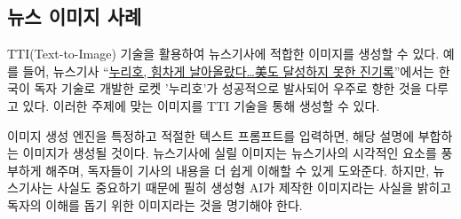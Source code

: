 \documentclass[
  letterpaper,
]{book}
\begin{document}
\hypertarget{uxb274uxc2a4-uxc774uxbbf8uxc9c0-uxc0acuxb840}{%
\subsection{뉴스 이미지
사례}\label{uxb274uxc2a4-uxc774uxbbf8uxc9c0-uxc0acuxb840}}

TTI(Text-to-Image) 기술을 활용하여 뉴스기사에 적합한 이미지를 생성할 수
있다. 예를 들어, 뉴스기사
``\href{https://v.daum.net/v/20230525184307343}{누리호, 힘차게
날아올랐다\ldots 美도 달성하지 못한 진기록}''에서는 한국이 독자 기술로
개발한 로켓 '누리호'가 성공적으로 발사되어 우주로 향한 것을 다루고 있다.
이러한 주제에 맞는 이미지를 TTI 기술을 통해 생성할 수 있다.

이미지 생성 엔진을 특정하고 적절한 텍스트 프롬프트를 입력하면, 해당
설명에 부합하는 이미지가 생성될 것이다. 뉴스기사에 실릴 이미지는
뉴스기사의 시각적인 요소를 풍부하게 해주며, 독자들이 기사의 내용을 더
쉽게 이해할 수 있게 도와준다. 하지만, 뉴스기사는 사실도 중요하기 때문에
필히 생성형 AI가 제작한 이미지라는 사실을 밝히고 독자의 이해를 돕기 위한
이미지라는 것을 명기해야 한다.
\end{document}
